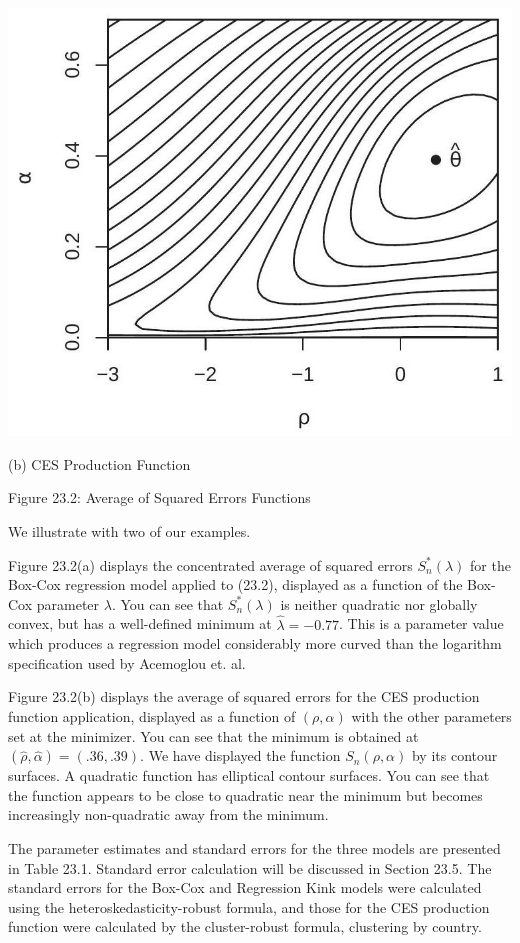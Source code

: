 \documentclass[10pt]{article}
\begin{document}
\includegraphics[max width=\textwidth]{2022_10_23_afe6a5896d8677a5cd30g-04(1)}

(b) CES Production Function

Figure 23.2: Average of Squared Errors Functions

We illustrate with two of our examples.

Figure 23.2(a) displays the concentrated average of squared errors $S_{n}^{*}(\lambda)$ for the Box-Cox regression model applied to (23.2), displayed as a function of the Box-Cox parameter $\lambda$. You can see that $S_{n}^{*}(\lambda)$ is neither quadratic nor globally convex, but has a well-defined minimum at $\widehat{\lambda}=-0.77$. This is a parameter value which produces a regression model considerably more curved than the logarithm specification used by Acemoglou et. al.

Figure 23.2(b) displays the average of squared errors for the CES production function application, displayed as a function of $(\rho, \alpha)$ with the other parameters set at the minimizer. You can see that the minimum is obtained at $(\widehat{\rho}, \widehat{\alpha})=(.36, .39)$. We have displayed the function $S_{n}(\rho, \alpha)$ by its contour surfaces. A quadratic function has elliptical contour surfaces. You can see that the function appears to be close to quadratic near the minimum but becomes increasingly non-quadratic away from the minimum.

The parameter estimates and standard errors for the three models are presented in Table 23.1. Standard error calculation will be discussed in Section 23.5. The standard errors for the Box-Cox and Regression Kink models were calculated using the heteroskedasticity-robust formula, and those for the CES production function were calculated by the cluster-robust formula, clustering by country.
\end{document}
